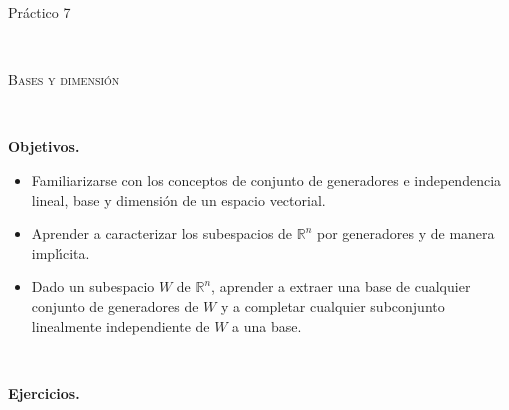\documentclass[12pt]{amsart}
\begin{document}
	
	
\centerline{\Large{Pr\' actico 7}}
	
\
	
\centerline{\textsc{Bases y dimensi\' on}}
	
\
	
\noindent \textbf{Objetivos.} 
	
\begin{itemize}
\item Familiarizarse con los conceptos de conjunto de generadores e independencia lineal, base y dimensi\' on de un espacio vectorial.
		
\item Aprender a caracterizar los subespacios de $\mathbb R^n$ por generadores y de manera impl\' \i cita.

\item Dado un subespacio $W$ de $\mathbb R^n$, aprender a extraer una base de cualquier conjunto de generadores de $W$ y a completar cualquier subconjunto linealmente independiente de $W$ a una base.

\end{itemize}
	
	\
	
	\noindent \textbf{Ejercicios.} 
	
\end{document}
